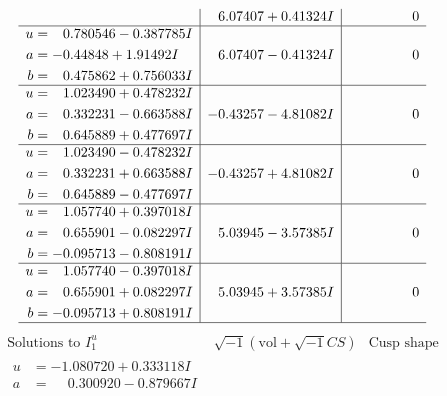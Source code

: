 \documentclass[1p]{elsarticle_modified}
\theoremstyle{definition}
\newcommand{\I}{\sqrt{-1}}
\begin{document}
$$\begin{array}{c|c|c}
 & \phantom{-}6.07407 + 0.41324 I & \phantom{-0.000000 } 0 \\ \hline\begin{aligned}
u &= \phantom{-}0.780546 - 0.387785 I \\
a &= -0.44848 + 1.91492 I \\
b &= \phantom{-}0.475862 + 0.756033 I\end{aligned}
 & \phantom{-}6.07407 - 0.41324 I & \phantom{-0.000000 } 0 \\ \hline\begin{aligned}
u &= \phantom{-}1.023490 + 0.478232 I \\
a &= \phantom{-}0.332231 - 0.663588 I \\
b &= \phantom{-}0.645889 + 0.477697 I\end{aligned}
 & -0.43257 - 4.81082 I & \phantom{-0.000000 } 0 \\ \hline\begin{aligned}
u &= \phantom{-}1.023490 - 0.478232 I \\
a &= \phantom{-}0.332231 + 0.663588 I \\
b &= \phantom{-}0.645889 - 0.477697 I\end{aligned}
 & -0.43257 + 4.81082 I & \phantom{-0.000000 } 0 \\ \hline\begin{aligned}
u &= \phantom{-}1.057740 + 0.397018 I \\
a &= \phantom{-}0.655901 - 0.082297 I \\
b &= -0.095713 - 0.808191 I\end{aligned}
 & \phantom{-}5.03945 - 3.57385 I & \phantom{-0.000000 } 0 \\ \hline\begin{aligned}
u &= \phantom{-}1.057740 - 0.397018 I \\
a &= \phantom{-}0.655901 + 0.082297 I \\
b &= -0.095713 + 0.808191 I\end{aligned}
 & \phantom{-}5.03945 + 3.57385 I & \phantom{-0.000000 } 0\\
 \hline 
 \end{array}$$\newpage$$\begin{array}{c|c|c}  
\text{Solutions to }I^u_{1}& \I (\text{vol} + \sqrt{-1}CS) & \text{Cusp shape}\\
 \hline 
\begin{aligned}
u &= -1.080720 + 0.333118 I \\
a &= \phantom{-}0.300920 - 0.879667 I \\

\end{aligned}
\end{array}$$
\end{document}
